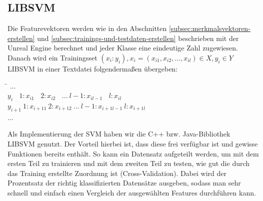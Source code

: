 \subsection{LIBSVM}
\label{subsec:libsvm}
Die Featurevektoren werden wie in den Abschnitten \ref{subsec:merkmalsvektoren-erstellen} und \ref{subsec:trainings-und-testdaten-erstellen} beschrieben mit der Unreal Engine berechnet und jeder Klasse eine eindeutige Zahl zugewiesen. Danach wird ein Trainingsset $(x_{i}:y_{i}), x_{i} = (x_{i1},x_{i2},...,x_{il}) \in X, y_{i} \in Y$ LIBSVM in einer Textdatei folgendermaßen übergeben:
\begin{tabbing}
\qquad \= $... $\\
\>$ y_{i}\ \ \ \ 1:x_{i1}\ \ \ \ 2:x_{i2}\ \ \ \ ...\ l-1:x_{il-1}\ \ \ \ l:x_{il} $\\
\>$ y_{i+1}\ 1:x_{i+11}\ 2:x_{i+12}\ ...\ l-1:x_{i+1l-1}\ l:x_{i+1l} $\\
\>$ ... $\\
\end{tabbing}
Als Implementierung der SVM haben wir die C++ bzw. Java-Bibliothek LIBSVM genutzt. Der Vorteil hierbei ist, dass diese frei verfügbar ist und gewisse Funktionen bereits enthält. So kann ein Datensatz aufgeteilt werden, um mit dem ersten Teil zu trainieren und mit dem zweiten Teil zu testen, wie gut die durch das Training erstellte Zuordnung ist (Cross-Validation). Dabei wird der Prozentsatz der richtig klassifizierten Datensätze ausgeben, sodass man sehr schnell und einfach einen Vergleich der ausgewählten Features durchführen kann. 

